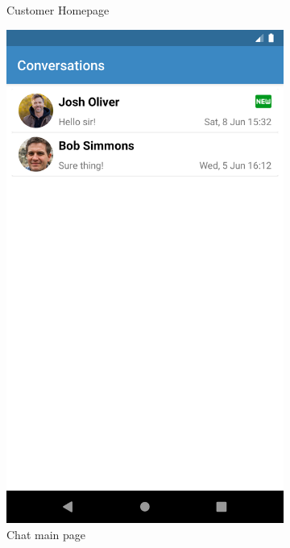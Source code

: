 \begin{samepage}
\begin{figure}[h]
\begin{subfigure}{.5\textwidth}
  \caption{Customer Homepage}
\end{subfigure}%
\begin{subfigure}{.5\textwidth}
  \centering
  \includegraphics[height=.3\textheight, keepaspectratio=true]{Img/Chat}
  \caption{Chat main page}
\end{subfigure}
\vspace{0.5cm}
\begin{subfigure}{.5\textwidth}
  \centering

\end{subfigure}
\end{figure}
\end{samepage}
